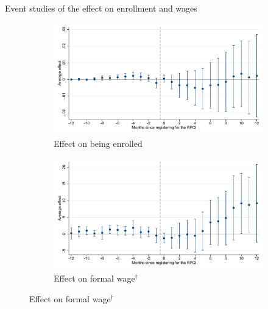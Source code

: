 \documentclass[notes,11pt, aspectratio=169]{beamer}
\begin{document}
\begin{frame}{Event studies of the effect on enrollment and wages}

\begin{figure}[H]
    \centering
    
    \begin{subfigure}{0.38\textwidth}
    \caption{Effect on being enrolled}
    \includegraphics[width=\textwidth]{04_Figures/muestra_10porciento/event_study_alta_dcdh.pdf}
    \end{subfigure}
    \begin{subfigure}{0.38\textwidth}
    \caption{Effect on formal wage$^\dagger$}
    \includegraphics[width=\textwidth]{04_Figures/muestra_10porciento/event_study_sal_formal_dcdh.pdf}
    \end{subfigure}
    

\end{figure}
\end{frame}
\end{document}
